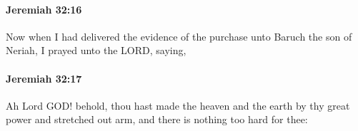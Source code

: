 		\paragraph{Jeremiah 32:16} %
			\label{JEREMIAH-32-16}

			Now when I had delivered the evidence of the purchase unto Baruch the son of Neriah, I prayed unto the LORD, saying,


		\paragraph{Jeremiah 32:17} %
			\label{JEREMIAH-32-17}

			Ah Lord GOD! behold, thou hast made the heaven and the earth by thy great power and stretched out arm, and there is nothing too hard for thee:


